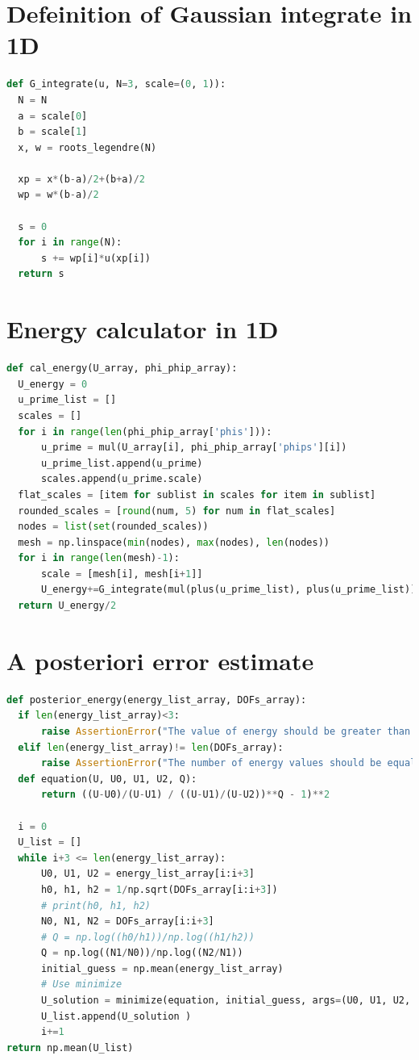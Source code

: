 \documentclass[twoside,twocolumn,10pt]{article}
\begin{document}
\section{Defeinition of Gaussian integrate in 1D}
\label{Apdx:Gaussian-1D}
\begin{lstlisting}[language=Python, caption=Defeinition of Gaussian integrate in 1D]
def G_integrate(u, N=3, scale=(0, 1)):
  N = N  
  a = scale[0] 
  b = scale[1]
  x, w = roots_legendre(N)

  xp = x*(b-a)/2+(b+a)/2
  wp = w*(b-a)/2

  s = 0
  for i in range(N):
      s += wp[i]*u(xp[i])
  return s
\end{lstlisting}

\section{Energy calculator in 1D}
\label{Apdx:energy-1D}
\begin{lstlisting}[language=Python, caption=Energy calculator in 1D]
def cal_energy(U_array, phi_phip_array):
  U_energy = 0
  u_prime_list = []
  scales = []
  for i in range(len(phi_phip_array['phis'])):
      u_prime = mul(U_array[i], phi_phip_array['phips'][i])
      u_prime_list.append(u_prime)
      scales.append(u_prime.scale)
  flat_scales = [item for sublist in scales for item in sublist]
  rounded_scales = [round(num, 5) for num in flat_scales]
  nodes = list(set(rounded_scales))
  mesh = np.linspace(min(nodes), max(nodes), len(nodes))
  for i in range(len(mesh)-1):
      scale = [mesh[i], mesh[i+1]]
      U_energy+=G_integrate(mul(plus(u_prime_list), plus(u_prime_list)),N=9, scale=scale)
  return U_energy/2
\end{lstlisting}

\section{A posteriori error estimate}
\label{Apdx:post}
\begin{lstlisting}[language=Python, caption=A posteriori error estimate]
def posterior_energy(energy_list_array, DOFs_array):
  if len(energy_list_array)<3:
      raise AssertionError("The value of energy should be greater than three!")
  elif len(energy_list_array)!= len(DOFs_array):
      raise AssertionError("The number of energy values should be equal to the number of DOFs!")
  def equation(U, U0, U1, U2, Q):
      return ((U-U0)/(U-U1) / ((U-U1)/(U-U2))**Q - 1)**2

  i = 0
  U_list = []
  while i+3 <= len(energy_list_array):
      U0, U1, U2 = energy_list_array[i:i+3]
      h0, h1, h2 = 1/np.sqrt(DOFs_array[i:i+3])
      # print(h0, h1, h2)
      N0, N1, N2 = DOFs_array[i:i+3]
      # Q = np.log((h0/h1))/np.log((h1/h2))
      Q = np.log((N1/N0))/np.log((N2/N1))
      initial_guess = np.mean(energy_list_array)
      # Use minimize
      U_solution = minimize(equation, initial_guess, args=(U0, U1, U2, Q)).x
      U_list.append(U_solution )
      i+=1
return np.mean(U_list)
\end{lstlisting}
  
\end{document}
